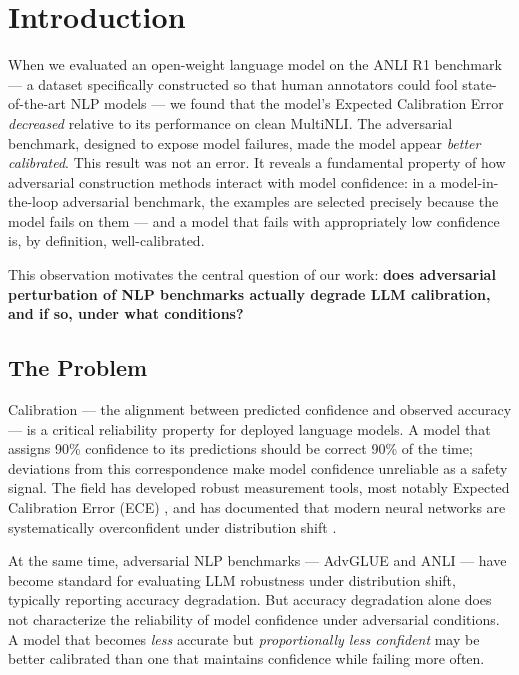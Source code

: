 \section{Introduction}

When we evaluated an open-weight language model on the ANLI R1 benchmark --- a dataset specifically constructed so that human annotators could fool state-of-the-art NLP models --- we found that the model's Expected Calibration Error \textit{decreased} relative to its performance on clean MultiNLI. The adversarial benchmark, designed to expose model failures, made the model appear \textit{better calibrated}. This result was not an error. It reveals a fundamental property of how adversarial construction methods interact with model confidence: in a model-in-the-loop adversarial benchmark, the examples are selected precisely because the model fails on them --- and a model that fails with appropriately low confidence is, by definition, well-calibrated.

This observation motivates the central question of our work: \textbf{does adversarial perturbation of NLP benchmarks actually degrade LLM calibration, and if so, under what conditions?}

\subsection{The Problem}

Calibration --- the alignment between predicted confidence and observed accuracy --- is a critical reliability property for deployed language models. A model that assigns 90\% confidence to its predictions should be correct 90\% of the time; deviations from this correspondence make model confidence unreliable as a safety signal. The field has developed robust measurement tools, most notably Expected Calibration Error (ECE) \citep{guo2017calibration}, and has documented that modern neural networks are systematically overconfident under distribution shift \citep{minderer2021revisiting}.

At the same time, adversarial NLP benchmarks --- AdvGLUE \citep{wang2021adversarial} and ANLI \citep{nie2020adversarial} --- have become standard for evaluating LLM robustness under distribution shift, typically reporting accuracy degradation. But accuracy degradation alone does not characterize the reliability of model confidence under adversarial conditions. A model that becomes \textit{less} accurate but \textit{proportionally less confident} may be better calibrated than one that maintains confidence while failing more often.

